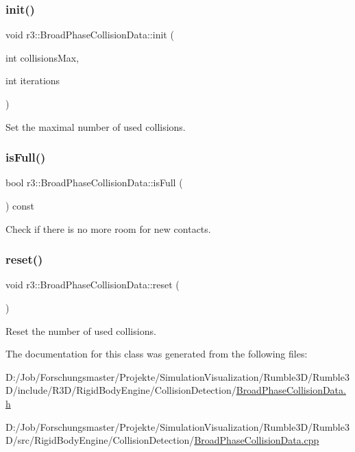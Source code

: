 \subsubsection{\texorpdfstring{init()}{init()}}
{\footnotesize\ttfamily void r3\+::\+Broad\+Phase\+Collision\+Data\+::init (\begin{DoxyParamCaption}\item[{int}]{collisions\+Max,  }\item[{int}]{iterations }\end{DoxyParamCaption})}

Set the maximal number of used collisions. \mbox{\label{classr3_1_1_broad_phase_collision_data_a2a553a4971808f372fc4511bdcd8797c}} 
\subsubsection{\texorpdfstring{is\+Full()}{isFull()}}
{\footnotesize\ttfamily bool r3\+::\+Broad\+Phase\+Collision\+Data\+::is\+Full (\begin{DoxyParamCaption}{ }\end{DoxyParamCaption}) const}

Check if there is no more room for new contacts. \mbox{\label{classr3_1_1_broad_phase_collision_data_a258a014684e0c480929e8980a40a5ab9}} 
\subsubsection{\texorpdfstring{reset()}{reset()}}
{\footnotesize\ttfamily void r3\+::\+Broad\+Phase\+Collision\+Data\+::reset (\begin{DoxyParamCaption}{ }\end{DoxyParamCaption})}

Reset the number of used collisions. 

The documentation for this class was generated from the following files\+:\begin{DoxyCompactItemize}
\item 
D\+:/\+Job/\+Forschungsmaster/\+Projekte/\+Simulation\+Visualization/\+Rumble3\+D/\+Rumble3\+D/include/\+R3\+D/\+Rigid\+Body\+Engine/\+Collision\+Detection/\mbox{\hyperlink{_broad_phase_collision_data_8h}{Broad\+Phase\+Collision\+Data.\+h}}\item 
D\+:/\+Job/\+Forschungsmaster/\+Projekte/\+Simulation\+Visualization/\+Rumble3\+D/\+Rumble3\+D/src/\+Rigid\+Body\+Engine/\+Collision\+Detection/\mbox{\hyperlink{_broad_phase_collision_data_8cpp}{Broad\+Phase\+Collision\+Data.\+cpp}}\end{DoxyCompactItemize}
